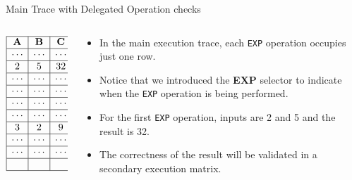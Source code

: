 \begin{frame}{Main Trace with Delegated Operation checks}
\begin{columns}
\begin{column}{0.3\textwidth}
$$\begin{array}{|c|c|c|c|}
\hline
\textbf{A} &  \textbf{B} & \textbf{C} &  \textbf{EXP}\\ \hline
\cdots & \cdots & \cdots & 0 \\ \hline
2 & 5 & 32 & 1 \\ \hline
\cdots & \cdots & \cdots & 0 \\ \hline
\cdots & \cdots & \cdots & 0 \\ \hline
\cdots & \cdots & \cdots & 0 \\ \hline
\cdots & \cdots & \cdots & 0 \\ \hline
3 & 2 & 9 & 1 \\ \hline
\cdots & \cdots & \cdots & 0 \\ \hline
\cdots & \cdots & \cdots & 0 \\ \hline
& & & \\ \hline
\end{array} $$
\end{column}
\begin{column}{0.7\textwidth}
\begin{itemize}
\item In the main execution trace, each \texttt{EXP} operation occupies
just one row.
\item Notice that we introduced the \textbf{EXP} selector to indicate
when the \texttt{EXP} operation is being performed.
\item For the first \texttt{EXP} operation, inputs are 2
and 5 and the result is 32.
\item The correctness of the result will be
validated in a secondary execution matrix.
\end{itemize}
\end{column}
\end{columns}
\end{frame}




